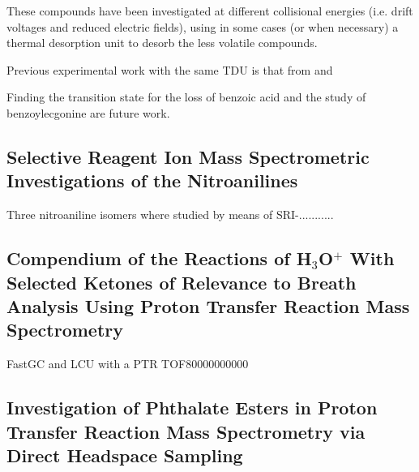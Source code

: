 These compounds have been investigated at different collisional energies (i.e. drift voltages and reduced electric fields), using in some cases (or when necessary) a thermal desorption unit to desorb the less volatile compounds.



Previous experimental work with the same TDU is that from \citeauthor{blenkhorn2019novel} and  \citeauthor{gonzalez2017development}
\cite{blenkhorn2019novel,gonzalez2017development}










Finding the transition state for the loss of benzoic acid and the study of benzoylecgonine are future work.













\subsection{Selective Reagent Ion Mass Spectrometric Investigations of the Nitroanilines}

Three nitroaniline isomers where studied by means of SRI-...........




\subsection{Compendium of the Reactions of H$_3$O$^+$ With Selected Ketones of Relevance
to Breath Analysis Using Proton Transfer Reaction Mass Spectrometry}


FastGC and LCU with a PTR TOF80000000000



\subsection{Investigation of Phthalate Esters in Proton Transfer Reaction Mass Spectrometry
via Direct Headspace Sampling}


